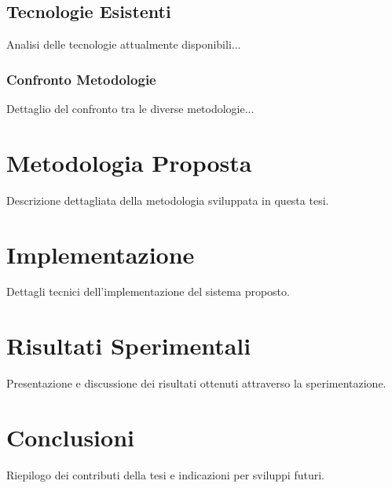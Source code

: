 \documentclass[12pt,a4paper,oneside]{book}
\begin{document}
\section{Tecnologie Esistenti}

Analisi delle tecnologie attualmente disponibili...

\subsection{Confronto Metodologie}

Dettaglio del confronto tra le diverse metodologie...

\chapter{Metodologia Proposta}

Descrizione dettagliata della metodologia sviluppata in questa tesi.

\chapter{Implementazione}

Dettagli tecnici dell'implementazione del sistema proposto.

\chapter{Risultati Sperimentali}

Presentazione e discussione dei risultati ottenuti attraverso la sperimentazione.

\chapter{Conclusioni}

Riepilogo dei contributi della tesi e indicazioni per sviluppi futuri.
\end{document}
